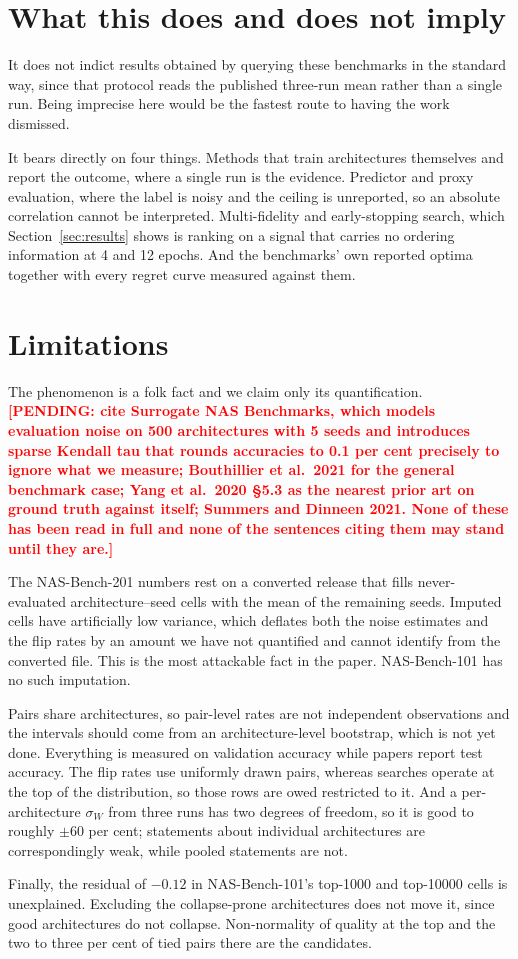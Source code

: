 \documentclass[11pt]{article}
\newcommand{\pending}[1]{\textcolor{red}{\textbf{[PENDING: #1]}}}
\begin{document}
\section{What this does and does not imply}\label{sec:scope}

It does not indict results obtained by querying these benchmarks in the standard way, since that protocol
reads the published three-run mean rather than a single run. Being imprecise here would be the fastest
route to having the work dismissed.

It bears directly on four things. Methods that train architectures themselves and report the outcome,
where a single run is the evidence. Predictor and proxy evaluation, where the label is noisy and the
ceiling is unreported, so an absolute correlation cannot be interpreted. Multi-fidelity and
early-stopping search, which Section~\ref{sec:results} shows is ranking on a signal that carries no
ordering information at 4 and 12 epochs. And the benchmarks' own reported optima together with every
regret curve measured against them.

\section{Limitations}\label{sec:limits}

The phenomenon is a folk fact and we claim only its quantification. \pending{cite Surrogate NAS
Benchmarks, which models evaluation noise on 500 architectures with 5 seeds and introduces sparse Kendall
tau that rounds accuracies to 0.1 per cent precisely to ignore what we measure; Bouthillier et al.\ 2021
for the general benchmark case; Yang et al.\ 2020 §5.3 as the nearest prior art on ground truth against
itself; Summers and Dinneen 2021. None of these has been read in full and none of the sentences citing
them may stand until they are.}

The NAS-Bench-201 numbers rest on a converted release that fills never-evaluated architecture--seed cells
with the mean of the remaining seeds. Imputed cells have artificially low variance, which deflates both
the noise estimates and the flip rates by an amount we have not quantified and cannot identify from the
converted file. This is the most attackable fact in the paper. NAS-Bench-101 has no such imputation.

Pairs share architectures, so pair-level rates are not independent observations and the intervals should
come from an architecture-level bootstrap, which is not yet done. Everything is measured on validation
accuracy while papers report test accuracy. The flip rates use uniformly drawn pairs, whereas searches
operate at the top of the distribution, so those rows are owed restricted to it. And a per-architecture
$\sigma_W$ from three runs has two degrees of freedom, so it is good to roughly $\pm 60$ per cent;
statements about individual architectures are correspondingly weak, while pooled statements are not.

Finally, the residual of $-0.12$ in NAS-Bench-101's top-1000 and top-10000 cells is unexplained.
Excluding the collapse-prone architectures does not move it, since good architectures do not collapse.
Non-normality of quality at the top and the two to three per cent of tied pairs there are the candidates.
\end{document}
